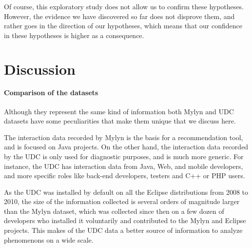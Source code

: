 \documentclass[times]{smrauth}
\begin{document}
Of course, this exploratory study does not allow us to confirm these hypotheses. However, the evidence we have discovered so far does not disprove them, and rather goes in the direction of our hypotheses, which means that our confidence in these hypotheses is higher as a consequence.



\section{Discussion}

\paragraph{Comparison of the datasets}
Although they represent the same kind of information both Mylyn and UDC datasets have some peculiarities that make them unique that we discuss here.

The interaction data recorded by Mylyn is the basis for a recommendation tool, and is focused on Java projects. On the other hand, the interaction data recorded by the UDC is only used for diagnostic purposes, and is much more generic. For instance, the UDC has interaction data from Java, Web, and mobile developers, and more specific roles like back-end developers, testers and C++ or PHP users. 

As the UDC was installed by default on all the Eclipse distributions from 2008 to 2010, the size of the information collected is several orders of magnitude larger than the Mylyn dataset, which was collected since then on a few dozen of developers who installed it voluntarily and contributed to the Mylyn and Eclipse projects. This makes of the UDC data a better source of information to analyze phenomenons on a wide scale.
\end{document}
